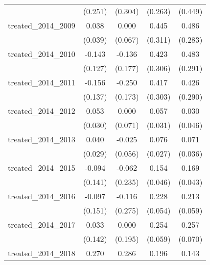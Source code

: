 {\begin{tabular}{l*{4}{c}}
            &     (0.251)         &     (0.304)         &     (0.263)         &     (0.449)         \\
[1em]
treated\_2014\_2009&       0.038         &       0.000         &       0.445         &       0.486         \\
            &     (0.039)         &     (0.067)         &     (0.311)         &     (0.283)         \\
[1em]
treated\_2014\_2010&      -0.143         &      -0.136         &       0.423         &       0.483         \\
            &     (0.127)         &     (0.177)         &     (0.306)         &     (0.291)         \\
[1em]
treated\_2014\_2011&      -0.156         &      -0.250         &       0.417         &       0.426         \\
            &     (0.137)         &     (0.173)         &     (0.303)         &     (0.290)         \\
[1em]
treated\_2014\_2012&       0.053         &       0.000         &       0.057         &       0.030         \\
            &     (0.030)         &     (0.071)         &     (0.031)         &     (0.046)         \\
[1em]
treated\_2014\_2013&       0.040         &      -0.025         &       0.076\sym{**} &       0.071\sym{*}  \\
            &     (0.029)         &     (0.056)         &     (0.027)         &     (0.036)         \\
[1em]
treated\_2014\_2015&      -0.094         &      -0.062         &       0.154\sym{***}&       0.169\sym{***}\\
            &     (0.141)         &     (0.235)         &     (0.046)         &     (0.043)         \\
[1em]
treated\_2014\_2016&      -0.097         &      -0.116         &       0.228\sym{***}&       0.213\sym{***}\\
            &     (0.151)         &     (0.275)         &     (0.054)         &     (0.059)         \\
[1em]
treated\_2014\_2017&       0.033         &       0.000         &       0.254\sym{***}&       0.257\sym{***}\\
            &     (0.142)         &     (0.195)         &     (0.059)         &     (0.070)         \\
[1em]
treated\_2014\_2018&       0.270\sym{**} &       0.286\sym{*}  &       0.196\sym{***}&       0.143\sym{*}  \\

\end{tabular}}
